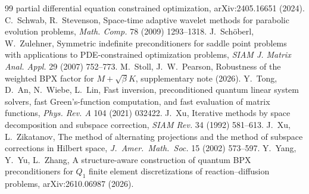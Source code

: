 \documentclass[11pt,a4paper]{article}
\theoremstyle{remark}
\begin{document}
\begin{thebibliography}{99}
  partial differential equation constrained optimization, arXiv:2405.16651
  (2024).
 C.~Schwab, R.~Stevenson, Space-time adaptive wavelet methods for
  parabolic evolution problems, \emph{Math. Comp.} 78 (2009) 1293--1318.
 J.~Sch\"oberl, W.~Zulehner, Symmetric indefinite preconditioners
  for saddle point problems with applications to PDE-constrained
  optimization problems, \emph{SIAM J. Matrix Anal. Appl.} 29 (2007)
  752--773.
 M.~Stoll, J.~W.~Pearson, Robustness of the weighted BPX
  factor for $M+\sqrt\beta K$, supplementary note (2026).
 Y.~Tong, D.~An, N.~Wiebe, L.~Lin, Fast inversion, preconditioned
  quantum linear system solvers, fast Green's-function computation, and
  fast evaluation of matrix functions, \emph{Phys. Rev. A} 104 (2021)
  032422.
 J.~Xu, Iterative methods by space decomposition and subspace
  correction, \emph{SIAM Rev.} 34 (1992) 581--613.
 J.~Xu, L.~Zikatanov, The method of alternating projections and
  the method of subspace corrections in Hilbert space, \emph{J.\ Amer.\
  Math.\ Soc.} 15 (2002) 573--597.
 Y.~Yang, Y.~Yu, L.~Zhang, A structure-aware construction of quantum
  BPX preconditioners for $Q_1$ finite element discretizations of
  reaction--diffusion problems, arXiv:2610.06987 (2026).
\end{thebibliography}
\end{document}
